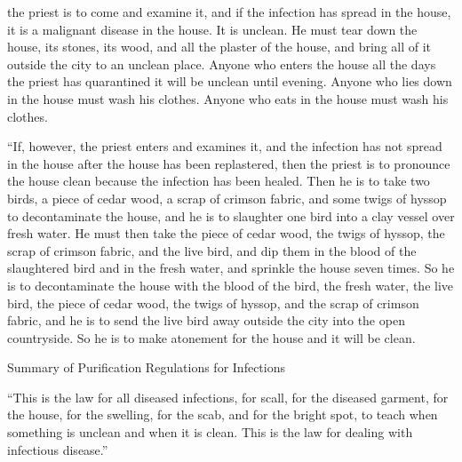{the priest
is
to come
and examine
it, and if the infection
has spread
in the house,
it is a malignant
disease
in the house.
It is
unclean.
He must tear
down the
house,
its stones,
its wood,
and all
the plaster
of the house,
and bring
all of it outside
the city
to
an unclean
place.
Anyone who enters
the house
all
the days
the priest has quarantined
it will be unclean
until
evening.
Anyone who lies
down in the house
must wash
his clothes.
Anyone who eats
in the house
must wash
his clothes.
\par }{\PP {}“If,
however, the priest
enters
and examines
it, and the
infection
has not
spread
in the house
after
the house
has been replastered,
then the priest
is to pronounce the house
clean
because
the infection
has been healed.
Then he is to take
two
birds,
a piece of cedar
wood,
a scrap of crimson
fabric,
and some twigs of hyssop
to decontaminate
the house,
and he is to slaughter
one
bird
into
a clay vessel
over fresh
water.
He must then take
the piece of cedar
wood,
the twigs of hyssop,
the scrap of crimson
fabric,
and the live
bird,
and dip
them in the blood
of the slaughtered
bird
and in the fresh
water,
and sprinkle
the house
seven
times.
So he is to decontaminate
the house
with the blood
of the bird,
the fresh
water,
the live
bird,
the piece of cedar
wood,
the twigs of hyssop,
and the scrap of crimson
fabric,
and he is to send
the
live
bird
away outside
the city
into
the open
countryside.
So he is to make atonement
for the house
and it will be clean.
\par }{\SH Summary of Purification Regulations for Infections
\par }{\PP {}“This
is the law
for all
diseased
infections,
for scall,
for the diseased
garment,
for the house,
for the swelling,
for the scab,
and for the bright spot,
to teach
when
something is unclean
and when
it is clean.
This
is the law
for dealing with infectious disease.”

}
